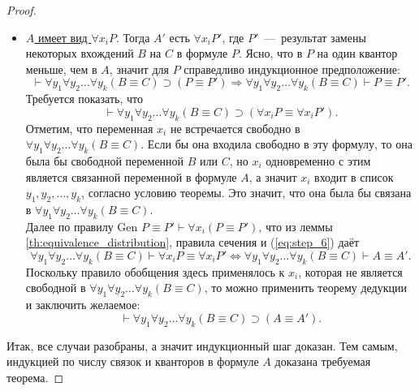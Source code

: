 \begin{proof}
\begin{itemize}
        \item \underline{$A$ имеет вид $\forall x_iP$}. Тогда $A'$ есть $\forall x_iP'$, где $P'$~---~результат замены некоторых вхождений $B$ на $C$ в формуле $P$. Ясно, что в $P$ на один квантор меньше, чем в $A$, значит для $P$ справедливо индукционное предположение:
        \begin{equation}\label{eq:step_6}
            \vdash \forall y_1\forall y_2\dots\forall y_k(B \equiv C) \supset (P \equiv P') \Longrightarrow \forall y_1\forall y_2\dots\forall y_k(B \equiv C) \vdash P \equiv P'.
        \end{equation}
        Требуется показать, что
        \[
            \vdash \forall y_1\forall y_2\dots\forall y_k(B \equiv C) \supset (\forall x_iP \equiv \forall x_iP').
        \]
        Отметим, что переменная $x_i$ не встречается свободно в $\forall y_1\forall y_2\dots\forall y_k(B \equiv C)$. Если бы она входила свободно в эту формулу, то она была бы свободной переменной $B$ или $C$, но $x_i$ одновременно с этим является связанной переменной в формуле $A$, а значит $x_i$ входит в список $y_1, y_2, \dots, y_k$, согласно условию теоремы. Это значит, что она была бы связана в $\forall y_1\forall y_2\dots\forall y_k(B \equiv C)$. \\
        Далее по правилу Gen $P \equiv P' \vdash \forall x_i(P \equiv P')$, что из леммы \ref{th:equivalence_distribution}, правила сечения и (\ref{eq:step_6}) даёт
        \[
            \forall y_1\forall y_2\dots\forall y_k(B \equiv C) \vdash \forall x_iP \equiv \forall x_iP' \Longleftrightarrow \forall y_1\forall y_2\dots\forall y_k(B \equiv C) \vdash A \equiv A'.
        \]
        Поскольку правило обобщения здесь применялось к $x_i$, которая не является свободной в $\forall y_1\forall y_2\dots\forall y_k(B \equiv C)$, то можно применить теорему дедукции и заключить желаемое:
        \[
            \vdash \forall y_1\forall y_2\dots\forall y_k(B \equiv C) \supset (A \equiv A').
        \]
    \end{itemize}
    Итак, все случаи разобраны, а значит индукционный шаг доказан. Тем самым, индукцией по числу связок и кванторов в формуле $A$ доказана требуемая теорема.
\end{proof}